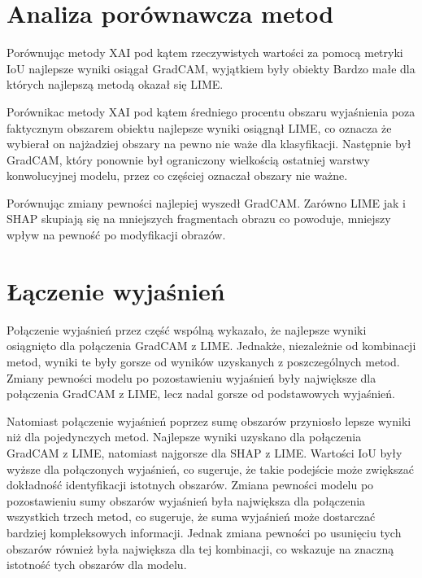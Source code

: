 \section*{Analiza porównawcza metod}

Porównując metody XAI pod kątem rzeczywistych wartości za pomocą metryki IoU najlepsze wyniki osiągał GradCAM, wyjątkiem były obiekty Bardzo małe dla których najlepszą metodą okazał się LIME.

Porównikac metody XAI pod kątem średniego procentu obszaru wyjaśnienia poza faktycznym obszarem obiektu najlepsze wyniki osiągnął LIME, co oznacza że wybierał on najżadziej obszary na pewno nie waże dla klasyfikacji.
Następnie był GradCAM, który ponownie był ograniczony wielkością ostatniej warstwy konwolucyjnej modelu, przez co częściej oznaczał obszary nie ważne.

Porównując zmiany pewności najlepiej wyszedł GradCAM.
Zarówno LIME jak i SHAP skupiają się na mniejszych fragmentach obrazu co powoduje, mniejszy wpływ na pewność po modyfikacji obrazów.

\section*{Łączenie wyjaśnień}

Połączenie wyjaśnień przez część wspólną wykazało, że najlepsze wyniki osiągnięto dla połączenia GradCAM z LIME.
Jednakże, niezależnie od kombinacji metod, wyniki te były gorsze od wyników uzyskanych z poszczególnych metod.
Zmiany pewności modelu po pozostawieniu wyjaśnień były największe dla połączenia GradCAM z LIME, lecz nadal gorsze od podstawowych wyjaśnień.

Natomiast połączenie wyjaśnień poprzez sumę obszarów przyniosło lepsze wyniki niż dla pojedynczych metod.
Najlepsze wyniki uzyskano dla połączenia GradCAM z LIME, natomiast najgorsze dla SHAP z LIME.
Wartości IoU były wyższe dla połączonych wyjaśnień, co sugeruje, że takie podejście może zwiększać dokładność identyfikacji istotnych obszarów.
Zmiana pewności modelu po pozostawieniu sumy obszarów wyjaśnień była największa dla połączenia wszystkich trzech metod, co sugeruje, że suma wyjaśnień może dostarczać bardziej kompleksowych informacji.
Jednak zmiana pewności po usunięciu tych obszarów również była największa dla tej kombinacji, co wskazuje na znaczną istotność tych obszarów dla modelu.

